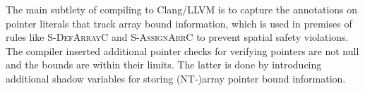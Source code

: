 
The main subtlety of compiling \checkedc to Clang/LLVM is to capture the annotations on pointer literals
that track array bound information, which is used in premises
of rules like \textsc{S-DefArrayC} and
  \textsc{S-AssignArrC} to prevent spatial safety violations.
The \checkedc compiler \cite{li22checkedc} inserted additional pointer checks 
for verifying pointers are not null and the bounds are within their limits.
The latter is done by introducing additional shadow variables for storing (NT-)array pointer bound information.


